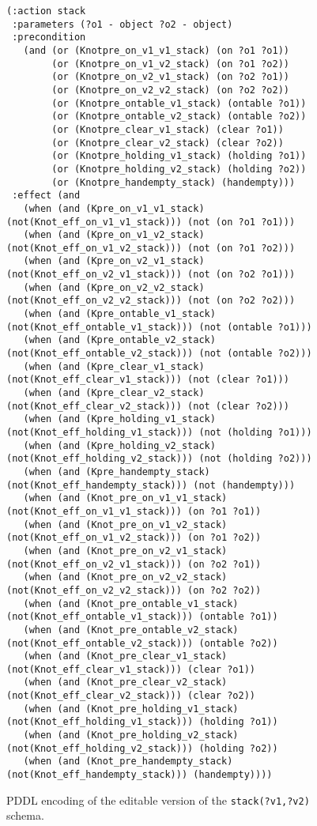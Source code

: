 \documentclass{article}
\begin{document}
\begin{figure}
  \begin{tiny}  
  \begin{verbatim}
(:action stack
 :parameters (?o1 - object ?o2 - object)
 :precondition
   (and (or (Knotpre_on_v1_v1_stack) (on ?o1 ?o1))
        (or (Knotpre_on_v1_v2_stack) (on ?o1 ?o2))
        (or (Knotpre_on_v2_v1_stack) (on ?o2 ?o1))
        (or (Knotpre_on_v2_v2_stack) (on ?o2 ?o2))
        (or (Knotpre_ontable_v1_stack) (ontable ?o1))
        (or (Knotpre_ontable_v2_stack) (ontable ?o2))
        (or (Knotpre_clear_v1_stack) (clear ?o1))
        (or (Knotpre_clear_v2_stack) (clear ?o2))
        (or (Knotpre_holding_v1_stack) (holding ?o1))
        (or (Knotpre_holding_v2_stack) (holding ?o2))
        (or (Knotpre_handempty_stack) (handempty)))
 :effect (and
   (when (and (Kpre_on_v1_v1_stack)(not(Knot_eff_on_v1_v1_stack))) (not (on ?o1 ?o1)))
   (when (and (Kpre_on_v1_v2_stack)(not(Knot_eff_on_v1_v2_stack))) (not (on ?o1 ?o2)))
   (when (and (Kpre_on_v2_v1_stack)(not(Knot_eff_on_v2_v1_stack))) (not (on ?o2 ?o1)))
   (when (and (Kpre_on_v2_v2_stack)(not(Knot_eff_on_v2_v2_stack))) (not (on ?o2 ?o2)))
   (when (and (Kpre_ontable_v1_stack)(not(Knot_eff_ontable_v1_stack))) (not (ontable ?o1)))
   (when (and (Kpre_ontable_v2_stack)(not(Knot_eff_ontable_v2_stack))) (not (ontable ?o2)))
   (when (and (Kpre_clear_v1_stack)(not(Knot_eff_clear_v1_stack))) (not (clear ?o1)))
   (when (and (Kpre_clear_v2_stack)(not(Knot_eff_clear_v2_stack))) (not (clear ?o2)))
   (when (and (Kpre_holding_v1_stack)(not(Knot_eff_holding_v1_stack))) (not (holding ?o1)))
   (when (and (Kpre_holding_v2_stack)(not(Knot_eff_holding_v2_stack))) (not (holding ?o2)))
   (when (and (Kpre_handempty_stack)(not(Knot_eff_handempty_stack))) (not (handempty)))
   (when (and (Knot_pre_on_v1_v1_stack)(not(Knot_eff_on_v1_v1_stack))) (on ?o1 ?o1))
   (when (and (Knot_pre_on_v1_v2_stack)(not(Knot_eff_on_v1_v2_stack))) (on ?o1 ?o2))
   (when (and (Knot_pre_on_v2_v1_stack)(not(Knot_eff_on_v2_v1_stack))) (on ?o2 ?o1))
   (when (and (Knot_pre_on_v2_v2_stack)(not(Knot_eff_on_v2_v2_stack))) (on ?o2 ?o2))
   (when (and (Knot_pre_ontable_v1_stack)(not(Knot_eff_ontable_v1_stack))) (ontable ?o1))
   (when (and (Knot_pre_ontable_v2_stack)(not(Knot_eff_ontable_v2_stack))) (ontable ?o2))
   (when (and (Knot_pre_clear_v1_stack)(not(Knot_eff_clear_v1_stack))) (clear ?o1))
   (when (and (Knot_pre_clear_v2_stack)(not(Knot_eff_clear_v2_stack))) (clear ?o2))
   (when (and (Knot_pre_holding_v1_stack)(not(Knot_eff_holding_v1_stack))) (holding ?o1))
   (when (and (Knot_pre_holding_v2_stack)(not(Knot_eff_holding_v2_stack))) (holding ?o2))
   (when (and (Knot_pre_handempty_stack)(not(Knot_eff_handempty_stack))) (handempty))))
  \end{verbatim}           
  \end{tiny}  
 \caption{\small PDDL encoding of the editable version of the {\tt\small stack(?v1,?v2)} schema.}
\label{fig:editable}
\end{figure}
\end{document}
